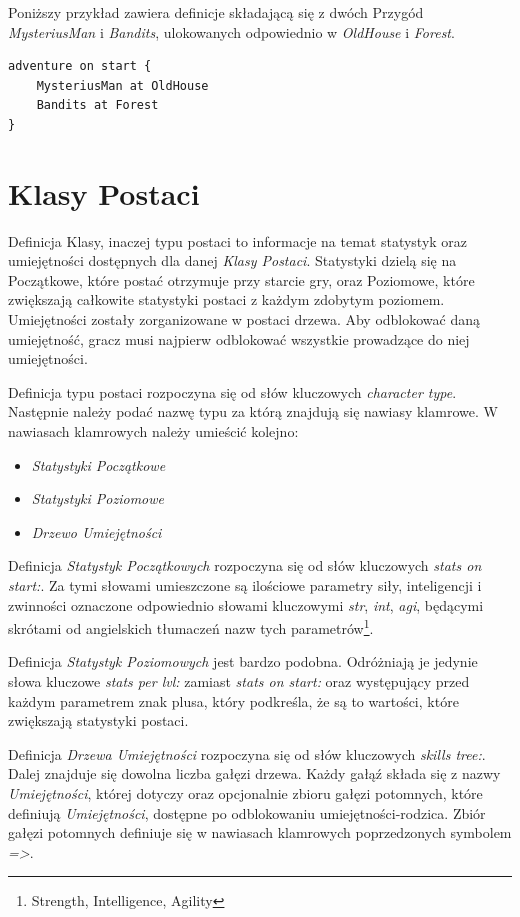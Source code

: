 \documentclass[openright]{xmgr}
\begin{document}
Poniższy przykład zawiera definicje składającą się z dwóch Przygód \textit{MysteriusMan} i \textit{Bandits}, ulokowanych odpowiednio w \textit{OldHouse} i \textit{Forest}.

\begin{verbatim}
adventure on start {
    MysteriusMan at OldHouse
    Bandits at Forest
}
\end{verbatim}

\section{Klasy Postaci}
Definicja Klasy, inaczej typu postaci to informacje na temat statystyk oraz umiejętności dostępnych dla danej \textit{Klasy Postaci}. Statystyki dzielą się na Początkowe, które postać otrzymuje przy starcie gry, oraz Poziomowe, które zwiększają całkowite statystyki postaci z każdym zdobytym poziomem. Umiejętności zostały zorganizowane w postaci drzewa. Aby odblokować daną umiejętność, gracz musi najpierw odblokować wszystkie prowadzące do niej umiejętności.

Definicja typu postaci rozpoczyna się od słów kluczowych \textit{character type}. Następnie należy podać nazwę typu za którą znajdują się nawiasy klamrowe. W nawiasach klamrowych należy umieścić kolejno:
\begin{itemize}
	\item \textit{Statystyki Początkowe}
	\item \textit{Statystyki Poziomowe}
	\item \textit{Drzewo Umiejętności}
\end{itemize}

Definicja \textit{Statystyk Początkowych} rozpoczyna się od słów kluczowych \textit{stats on start:}. Za tymi słowami umieszczone są ilościowe parametry siły, inteligencji i zwinności oznaczone odpowiednio słowami kluczowymi \textit{str}, \textit{int}, \textit{agi}, będącymi skrótami od angielskich tłumaczeń nazw tych parametrów\footnote{Strength, Intelligence, Agility}.

Definicja \textit{Statystyk Poziomowych} jest bardzo podobna. Odróżniają je jedynie słowa kluczowe \textit{stats per lvl:} zamiast  \textit{stats on start:} oraz występujący przed każdym parametrem znak plusa, który podkreśla, że są to wartości, które zwiększają statystyki postaci. 

Definicja \textit{Drzewa Umiejętności} rozpoczyna się od słów kluczowych \textit{skills tree:}. Dalej znajduje się dowolna liczba gałęzi drzewa.
Każdy gałąź składa się z nazwy \textit{Umiejętności}, której dotyczy oraz opcjonalnie zbioru gałęzi potomnych, które definiują \textit{Umiejętności}, dostępne po odblokowaniu umiejętności-rodzica.
Zbiór gałęzi potomnych definiuje się w nawiasach klamrowych poprzedzonych symbolem \textit{=>}. 
\end{document}
